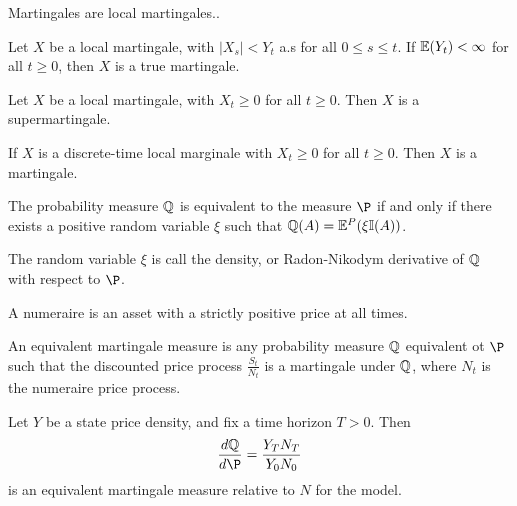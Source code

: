 \begin{thm}
  \label{sec:arbitrage-theory-12}
  Martingales are local martingales..
\end{thm}

\begin{thm}
  \label{sec:arbitrage-theory-13}
  Let $X$ be a local martingale, with $|X_{s}| < Y_{t}$ a.s for all $0
  \leq s \leq t$.  If $\E{Y_{t}} < \infty$ for all $t \geq 0$, then
  $X$ is a true martingale.
\end{thm}

\begin{thm}
  \label{sec:arbitrage-theory-15}
  Let $X$ be a local martingale, with $X_{t} \geq 0$ for all $t \geq
  0$.  Then $X$ is a supermartingale.
\end{thm}

\begin{thm}
  \label{sec:arbitrage-theory-16}
  If $X$ is a discrete-time local marginale with $X_{t} \geq 0$ for
  all $t \geq 0$. Then $X$ is a martingale.
\end{thm}

\begin{thm}
  \label{sec:arbitrage-theory-18}
  The probability measure $\Q$ is equivalent to the measure $\P$ if
  and only if there exists a positive random variable $\xi$ such that
  $\Q{A} = \E^{P}(\xi \I{A})$.

  The random variable $\xi$ is call the density, or Radon-Nikodym
  derivative of $\Q$ with respect to $\P$.
\end{thm}

\begin{defn}
  \label{sec:arbitrage-theory-19}
  A numeraire is an asset with a strictly positive price at all times.
\end{defn}

\begin{defn}
  \label{sec:arbitrage-theory-20}
  An equivalent martingale measure is any probability measure $\Q$
  equivalent ot $\P$ such that the discounted price process
  $\frac{S_{t}}{N_{t}}$ is a martingale under $\Q$, where $N_{t}$ is
  the numeraire price process.
\end{defn}

\begin{defn}
  \label{sec:arbitrage-theory-21}
  Let $Y$ be a state price density, and fix a time horizon $T > 0$.
  Then
  \begin{equation}
    \label{eq:4}
    \frac{d\Q}{d\P} = \frac{Y_{T} N_{T}}{Y_{0} N_{0}}
  \end{equation}
  is an equivalent martingale measure relative to $N$ for the model.
\end{defn}

